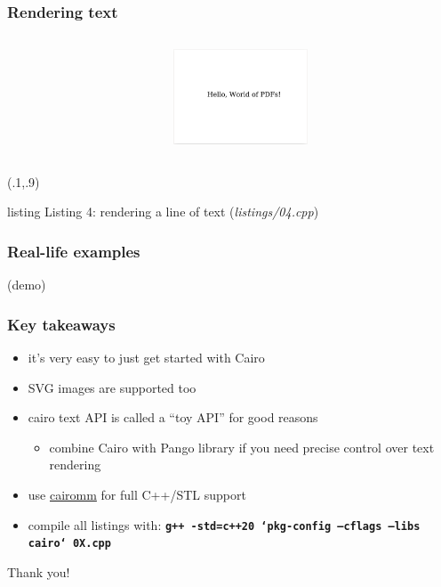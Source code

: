 \documentclass[aspectratio=169]{beamer}
\newcommand{\cppmethod}[1]{\texttt{\textbf{\textcolor{clCodeBlue}{#1}}}}
\begin{document}
\begin{frame}[fragile]
\frametitle{Rendering text}
\begin{columns}
  \begin{column}{0.7\textwidth}
    {\fontsize{3pt}{2.7}\selectfont
    
    \vspace{-12pt}
    }
  \end{column}
  \begin{column}{0.3\textwidth}
    \includegraphics[width=4cm,keepaspectratio]{pics/output_04_text.png}
  \end{column}
\end{columns}
\begin{textblock*}{\textwidth}(.1\textwidth,.9\textheight)
  \begin{beamercolorbox}[wd=.5\textwidth,left,sep=0.2cm]{listing}
    {\tiny Listing 4: rendering a line of text (\textit{listings/04.cpp})}
  \end{beamercolorbox}
\end{textblock*}
\end{frame}


\begin{frame}
\frametitle{Real-life examples}
\begin{center}
  {\Large (demo)}
\end{center}
\end{frame}


\begin{frame}
\frametitle{Key takeaways}
{\centering
\begin{itemize}
  \item it's very easy to just get started with Cairo
  \item SVG images are supported too
  \item cairo text API is called a ``toy API'' for good reasons
  \begin{itemize}
    \item combine Cairo with Pango library if you need precise control over text rendering
  \end{itemize}
  \item use \href{https://www.cairographics.org/cairomm/}{cairomm} for full C++/STL support
  \item compile all listings with: {\tiny \cppmethod{g++ -std=c++20 `pkg-config --cflags --libs cairo` 0X.cpp}}
\end{itemize}

\vspace{2ex}
\begin{center}{\Large Thank you!}\end{center}
}
\end{frame}
\end{document}
